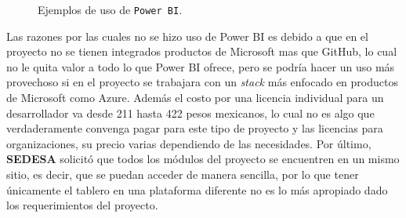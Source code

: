 \begin{figure}[ht]
  \centering

  \hfill


  \caption{Ejemplos de uso de \texttt{Power BI}.}
  \label{fig:overall}
\end{figure}

Las razones por las cuales no se hizo uso de Power BI es debido a que en el proyecto no se tienen integrados productos de Microsoft mas que GitHub, lo cual no le quita valor a todo lo que Power BI ofrece, pero se podría hacer un uso más provechoso si en el proyecto se trabajara con un \textit{stack} más enfocado en productos de Microsoft como Azure. Además el costo por una licencia individual para un desarrollador va desde 211 hasta 422 pesos mexicanos, lo cual no es algo que verdaderamente convenga pagar para este tipo de proyecto y las licencias para organizaciones, su precio varias dependiendo de las necesidades. Por último, \textbf{SEDESA} solicitó que todos los módulos del proyecto se encuentren en un mismo sitio, es decir, que se puedan acceder de manera sencilla, por lo que tener únicamente el tablero en una plataforma diferente no es lo más apropiado dado los requerimientos del proyecto.

